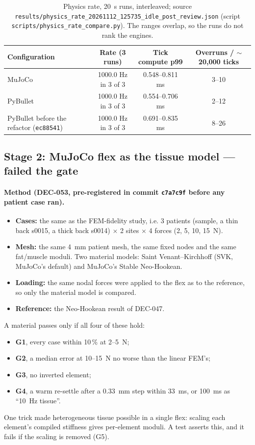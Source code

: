 \documentclass[11pt,a4paper]{article}
\newcommand{\src}[1]{\texttt{\small #1}}
\newcommand{\dec}[1]{\textsf{#1}}
\begin{document}
\begin{table}[h]
\centering\small
\begin{tabular}{@{}lccc@{}}
\toprule
Configuration & Rate (3 runs) & Tick compute p99 & Overruns / $\sim$20{,}000 ticks \\
\midrule
MuJoCo & 1000.0 Hz in 3 of 3 & 0.548--0.811 ms & 3--10 \\
PyBullet & 1000.0 Hz in 3 of 3 & 0.554--0.706 ms & 2--12 \\
PyBullet before the refactor (\texttt{ec88541}) & 1000.0 Hz in 3 of 3 & 0.691--0.835 ms & 8--26 \\
\bottomrule
\end{tabular}
\caption{Physics rate, 20~s runs, interleaved; source \src{results/physics\_rate\_20261112\_125735\_idle\_post\_review.json}
(script \src{scripts/physics\_rate\_compare.py}). The ranges overlap, so the runs do not rank the engines.}
\label{tab:rate}
\end{table}

\subsection{Stage 2: MuJoCo flex as the tissue model --- failed the gate}

\paragraph{Method (\dec{DEC-053}, pre-registered in commit \texttt{c7a7c9f} before any patient case ran).}
\begin{itemize}
  \item \textbf{Cases:} the same as the FEM-fidelity study, i.e. 3 patients (sample, a thin back s0015, a thick back
    s0014) $\times$ 2 sites $\times$ 4 forces (2, 5, 10, 15~N).
  \item \textbf{Mesh:} the same 4~mm patient mesh, the same fixed nodes and the same fat/muscle moduli. Two material
    models: Saint Venant--Kirchhoff (SVK, MuJoCo's default) and MuJoCo's Stable Neo-Hookean.
  \item \textbf{Loading:} the same nodal forces were applied to the flex as to the reference, so only the material
    model is compared.
  \item \textbf{Reference:} the Neo-Hookean result of \dec{DEC-047}.
\end{itemize}
A material passes only if all four of these hold:
\begin{itemize}
  \item \textbf{G1}, every case within 10\,\% at 2--5~N;
  \item \textbf{G2}, a median error at 10--15~N no worse than the linear FEM's;
  \item \textbf{G3}, no inverted element;
  \item \textbf{G4}, a warm re-settle after a 0.33~mm step within 33~ms, or 100~ms as ``10~Hz tissue''.
\end{itemize}
One trick made heterogeneous tissue possible in a single flex: scaling each element's compiled stiffness gives
per-element moduli. A test asserts this, and it fails if the scaling is removed (G5).
\end{document}

